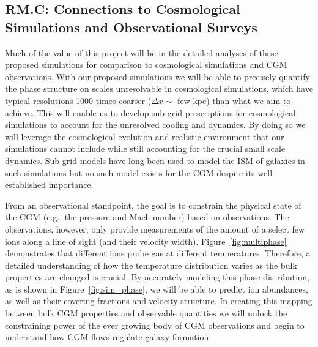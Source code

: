 \documentclass[11pt,letterpaper,english]{article}
\begin{document}
\vspace{-.25in}
\subsection{RM.C: Connections to Cosmological Simulations and Observational Surveys}
\vspace{-.2in}

Much of the value of this project will be in the detailed analyses of these proposed simulations for comparison to cosmological simulations and CGM observations. With our proposed simulations we will be able to precisely quantify the phase structure on scales unresolvable in cosmological simulations, which have typical resolutions 1000 times coarser ($\Delta x \sim$ few kpc) than what we aim to achieve. This will enable us to develop sub-grid prescriptions for cosmological simulations to account for the unresolved cooling and dynamics. By doing so we will leverage the cosmological evolution and realistic environment that our simulations cannot include while still accounting for the crucial small scale dynamics. Sub-grid models have long been used to model the ISM of galaxies in such simulations \cite{SpringelHernquist} but no such model exists for the CGM despite its well established importance. 

From an observational standpoint, the goal is to constrain the physical state of the CGM (e.g., the pressure and Mach number) based on observations. The observations, however, only provide measurements of the amount of a select few ions along a line of sight (and their velocity width). Figure~\ref{fig:multiphase} demonstrates that different ions probe gas at different temperatures. Therefore, a detailed understanding of how the temperature distribution varies as the bulk properties are changed is crucial. By accurately modeling this phase distribution, as is shown in Figure~\ref{fig:sim_phase}, we will be able to predict ion abundances, as well as their covering fractions and velocity structure. In creating this mapping between bulk CGM properties and observable quantities we will unlock the constraining power of the ever growing body of CGM observations and begin to understand how CGM flows regulate galaxy formation.


\end{document}
